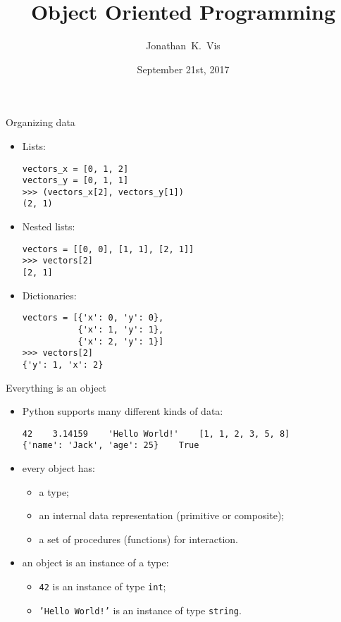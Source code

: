 \documentclass{beamer}
\author{Jonathan~K.~Vis}
\institute[LUMC]{Dept. of Human Genetics, Leiden University Medical Center}
\date{September 21st, 2017}
\title{Object Oriented Programming}
\begin{document}
\beamertemplatenavigationsymbolsempty

\begin{frame}
\titlepage
\end{frame}

\begin{frame}[fragile]{Organizing data}

\begin{itemize}
\item Lists:
\begin{verbatim}
vectors_x = [0, 1, 2]
vectors_y = [0, 1, 1]
>>> (vectors_x[2], vectors_y[1])
(2, 1)
\end{verbatim}

\item Nested lists:
\begin{verbatim}
vectors = [[0, 0], [1, 1], [2, 1]]
>>> vectors[2]
[2, 1]
\end{verbatim}

\item Dictionaries:
\begin{verbatim}
vectors = [{'x': 0, 'y': 0},
           {'x': 1, 'y': 1},
           {'x': 2, 'y': 1}]
>>> vectors[2]
{'y': 1, 'x': 2}
\end{verbatim}
\end{itemize}
\end{frame}

\begin{frame}[fragile]{Everything is an object}
\begin{itemize}
\item Python supports many different kinds of data:
\begin{verbatim}
42    3.14159    'Hello World!'    [1, 1, 2, 3, 5, 8]
{'name': 'Jack', 'age': 25}    True
\end{verbatim}

\item every \textcolor{pms280_compl}{object} has:
\begin{itemize}
\item a \textcolor{pms280_compl}{type};
\item an internal \textcolor{pms280_compl}{data representation}
(primitive or composite);
\item a set of \textcolor{pms280_compl}{procedures} (functions) for
interaction.
\end{itemize}

\item an object is an \textcolor{pms280_compl}{instance} of a type:
\begin{itemize}
\item \texttt{42} is an instance of type
\texttt{int};
\item \texttt{'Hello World!'} is an instance of type
\texttt{string}.
\end{itemize}
\end{itemize}
\end{frame}
\end{document}
